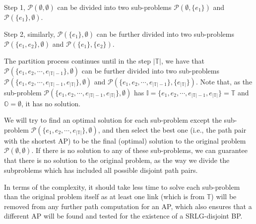 Step 1, $\mathcal{P}(\emptyset,\emptyset)$ can be  divided into two sub-problems $\mathcal{P}(\emptyset,\{e_1\})$ and $\mathcal{P}(\{e_1\},\emptyset)$.

Step 2, similarly, $\mathcal{P}(\{e_1\},\emptyset)$ can be further divided into two sub-problems $\mathcal{P}(\{e_1,e_2\},\emptyset)$ and $\mathcal{P}(\{e_1\},\{e_2\})$.

The partition process continues until in the step $|\mathbb{T}|$, we have that $\mathcal{P}(\{e_1,e_2,\cdots ,{e_{\left| \mathbb{T} \right|-1}}\},\emptyset)$ can be further divided into two sub-problems $\mathcal{P}(\{e_1,e_2,\cdots ,{e_{\left| \mathbb{T} \right|-1}}, {e_{\left| \mathbb{T} \right|}}\},\emptyset)$ and $\mathcal{P}(\{e_1,e_2,\cdots ,{e_{\left| \mathbb{T} \right|-1}}\},\{e_{\left| \mathbb{T} \right|}\})$. Note that, as the sub-problem $\mathcal{P}(\{e_1,e_2,\cdots ,{e_{\left| \mathbb{T} \right|-1}}, {e_{\left| \mathbb{T} \right|}}\},\emptyset)$ has ${\mathbb{I}=\{e_1,e_2,\cdots ,{e_{\left| \mathbb{T} \right|-1}}, {e_{\left| \mathbb{T} \right|}}\}}$$=\mathbb{T}$ and ${\mathbb{O}}=\emptyset$, it has no solution.

We will try to find an optimal solution for each sub-problem except the sub-problem $\mathcal{P}(\{e_1,e_2,\cdots ,{e_{\left| \mathbb{T} \right|}}\},\emptyset)$, and then select the best one (i.e., the path pair with the shortest AP) to be the final (optimal) solution to the original problem $\mathcal{P}(\emptyset,\emptyset)$. If there is no solution to any of these sub-problems, we can guarantee that there is no solution to the original problem, as the way we divide the subproblems which has included  all possible disjoint path pairs.


In terms of the complexity, it should take less time to solve each sub-problem than the original problem itself as at least one link (which is from $\mathbb{T}$) will be removed from any further path computation for an AP, which also ensures that a different AP will be found and tested for the existence of a SRLG-disjoint BP.

